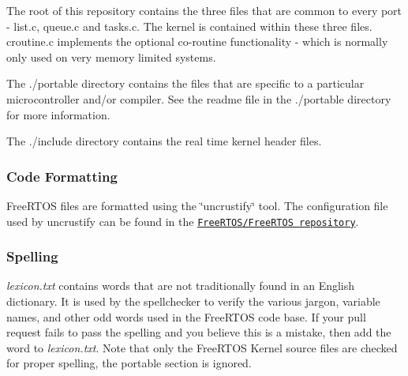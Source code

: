 \begin{DoxyItemize}
\item The root of this repository contains the three files that are common to every port -\/ list.\+c, queue.\+c and tasks.\+c. The kernel is contained within these three files. croutine.\+c implements the optional co-\/routine functionality -\/ which is normally only used on very memory limited systems.
\item The {\ttfamily ./portable} directory contains the files that are specific to a particular microcontroller and/or compiler. See the readme file in the {\ttfamily ./portable} directory for more information.
\item The {\ttfamily ./include} directory contains the real time kernel header files.
\end{DoxyItemize}

\subsubsection*{Code Formatting}

Free\+R\+T\+OS files are formatted using the \char`\"{}uncrustify\char`\"{} tool. The configuration file used by uncrustify can be found in the \href{https://github.com/FreeRTOS/FreeRTOS/blob/master/tools/uncrustify.cfg}{\tt Free\+R\+T\+O\+S/\+Free\+R\+T\+OS repository}.

\subsubsection*{Spelling}

{\itshape lexicon.\+txt} contains words that are not traditionally found in an English dictionary. It is used by the spellchecker to verify the various jargon, variable names, and other odd words used in the Free\+R\+T\+OS code base. If your pull request fails to pass the spelling and you believe this is a mistake, then add the word to {\itshape lexicon.\+txt}. Note that only the Free\+R\+T\+OS Kernel source files are checked for proper spelling, the portable section is ignored. 